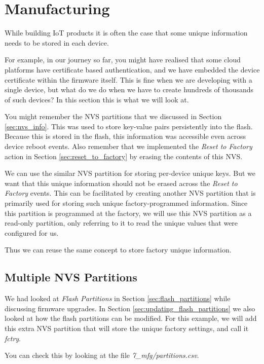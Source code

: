 \documentclass[main.tex]{subfiles}
\begin{document}
\chapter{Manufacturing}

While building IoT products it is often the case that some unique information needs to be stored in each device. 

For example, in our journey so far, you might have realised that some cloud platforms have certificate based authentication, and we have embedded the device certificate within the firmware itself. This is fine when we are developing with a single device, but what do we do when we have to create hundreds of thousands of such devices? In this section this is what we will look at.

You might remember the NVS partitions that we discussed in Section \ref{sec:nvs_info}. This was used to store key-value pairs persistently into the flash. Because this is stored in the flash, this information was accessible even across device reboot events. Also remember that we implemented the \textit{Reset to Factory} action in Section \ref{sec:reset_to_factory} by erasing the contents of this NVS.

We can use the similar NVS partition for storing per-device unique keys. But we want that this unique information should not be erased across the \textit{Reset to Factory} events. This can be facilitated by creating another NVS partition that is primarily used for storing such unique factory-programmed information. Since this partition is programmed at the factory, we will use this NVS partition as a read-only partition, only referring to it to read the unique values that were configured for us.

Thus we can reuse the same concept to store factory unique information.

\section{Multiple NVS Partitions}
We had looked at \textit{Flash Partitions} in Section \ref{sec:flash_partitions} while discussing firmware upgrades. In Section \ref{sec:updating_flash_partitions} we also looked at how the flash partitions can be modified. For this example, we will add this extra NVS partition that will store the unique factory settings, and call it \textit{fctry}.

You can check this by looking at the file \textit{7\_mfg/partitions.csv}.
\end{document}
